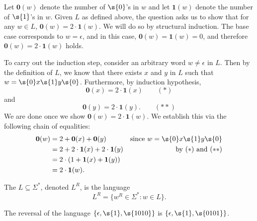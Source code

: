 \begin{solution}
Let $\mathbf{0}(w)$ denote the number of $\s{0}$'s in $w$ and let $\mathbf{1}(w)$ denote the number of $\s{1}$'s in $w$. Given $L$ as defined above, the question asks us to show that for any $w \in L$, $\mathbf{0}(w) = 2 \cdot \mathbf{1}(w)$. We will do so by structural induction.
The base case corresponds to $w = \epsilon$, and in this case, $\mathbf{0}(w) = \mathbf{1}(w) = 0$, and therefore $\mathbf{0}(w) = 2 \cdot \mathbf{1}(w)$ holds.

To carry out the induction step, consider an arbitrary word $w \neq \epsilon$ in $L$. Then by the definition of $L$, we know that there exists $x$ and $y$ in $L$ such that $w = \s{0}x\s{1}y\s{0}$. Furthermore, by induction hypothesis, 
\begin{equation*} %
    \mathbf{0}(x) = 2 \cdot \mathbf{1}(x) \quad \quad (*)
\end{equation*}
and 
\begin{equation*} %
    \mathbf{0}(y) = 2 \cdot \mathbf{1}(y). \quad \quad (**)
\end{equation*}
We are done once we show $\mathbf{0}(w) = 2 \cdot \mathbf{1}(w)$. We establish this via the following chain of equalities: 
\begin{align*}
    \mathbf{0}(w) & = 2 + \mathbf{0}(x) + \mathbf{0}(y) & \text{since $w = \s{0}x\s{1}y\s{0}$} \\
    & = 2 + 2 \cdot \mathbf{1}(x) + 2 \cdot \mathbf{1}(y) & \text{by $(*)$ and $(**)$}\\
    & = 2 \cdot (1 + \mathbf{1}(x) + \mathbf{1}(y)) \\
    & = 2 \cdot \mathbf{1}(w).
\end{align*}

\end{solution}

\begin{definition} \label{definition:Reversal-of-a-language}
The  $L \subseteq \Sigma^*$, denoted $L^R$, is the language
\[
    L^R = \{w^R \in \Sigma^* : w \in L\}. 
\]
\end{definition}

\begin{example} \label{example:Reversal-of-epsilon-1-1010}
The reversal of the language $\{\epsilon, \s{1}, \s{1010}\}$ is $\{\epsilon, \s{1}, \s{0101}\}$.
\end{example}

